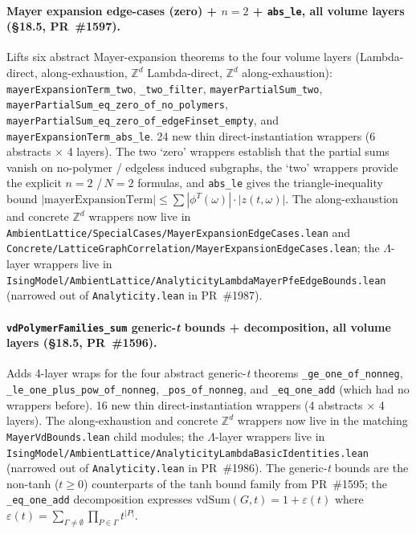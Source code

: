\documentclass[a4paper,11pt]{article}
\begin{document}
\paragraph{Mayer expansion edge-cases (zero) + $n = 2$ +
\texttt{abs\_le}, all volume layers (\S18.5, PR~\#1597).}
Lifts six abstract Mayer-expansion theorems to the four volume
layers (Lambda-direct, along-exhaustion, $\mathbb{Z}^d$ Lambda-direct,
$\mathbb{Z}^d$ along-exhaustion):
\texttt{mayerExpansionTerm\_two}, \texttt{\_two\_filter},
\texttt{mayerPartialSum\_two},
\texttt{mayerPartialSum\_eq\_zero\_of\_no\_polymers},
\texttt{mayerPartialSum\_eq\_zero\_of\_edgeFinset\_empty},
and \texttt{mayerExpansionTerm\_abs\_le}. 24 new thin
direct-instantiation wrappers (6 abstracts $\times$ 4 layers).
The two `zero' wrappers establish that the partial sums vanish
on no-polymer / edgeless induced subgraphs, the `two' wrappers
provide the explicit $n=2$ /$\,N=2$ formulas, and
\texttt{abs\_le} gives the triangle-inequality bound
$|\mathrm{mayerExpansionTerm}| \le \sum |\phi^T(\omega)| \cdot
|z(t,\omega)|$. The along-exhaustion and concrete $\mathbb{Z}^d$
wrappers now live in
\texttt{AmbientLattice/SpecialCases/MayerExpansionEdgeCases.lean}
and
\texttt{Concrete/LatticeGraphCorrelation/MayerExpansionEdgeCases.lean};
the $\Lambda$-layer wrappers live in
\texttt{IsingModel/AmbientLattice/AnalyticityLambdaMayerPfeEdgeBounds.lean}
(narrowed out of \texttt{Analyticity.lean} in PR~\#1987).

\paragraph{\texttt{vdPolymerFamilies\_sum} generic-\textit{t}
bounds + decomposition, all volume layers (\S18.5, PR~\#1596).}
Adds 4-layer wraps for the four abstract generic-\textit{t}
theorems
\texttt{\_ge\_one\_of\_nonneg},
\texttt{\_le\_one\_plus\_pow\_of\_nonneg},
\texttt{\_pos\_of\_nonneg}, and \texttt{\_eq\_one\_add}
(which had no wrappers before). 16 new thin
direct-instantiation wrappers (4 abstracts $\times$ 4 layers).
The along-exhaustion and concrete $\mathbb{Z}^d$ wrappers now live in
the matching \texttt{MayerVdBounds.lean} child modules; the
$\Lambda$-layer wrappers live in
\texttt{IsingModel/AmbientLattice/AnalyticityLambdaBasicIdentities.lean}
(narrowed out of \texttt{Analyticity.lean} in PR~\#1986).
The generic-\textit{t} bounds are the non-tanh ($t \geq 0$)
counterparts of the tanh bound family from PR~\#1595; the
\texttt{\_eq\_one\_add} decomposition expresses
$\mathrm{vdSum}(G,t) = 1 + \varepsilon(t)$ where
$\varepsilon(t) = \sum_{\Gamma \neq \emptyset} \prod_{P \in
\Gamma} t^{|P|}$.
\end{document}
